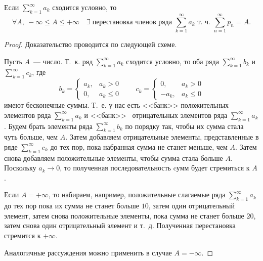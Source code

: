 \documentclass[../../main.tex]{subfiles}
\begin{document}
\begin{thm}[Риман]
	Если $\sum\limits_{k = 1}^{\infty} a_k$ сходится условно, то
	\[\forall A,\ - \infty \leq A \leq + \infty \quad \exists\;
	\text{перестановка членов ряда } \sum\limits_{k = 1}^{\infty} a_k \text{ 
	т.~ч. }
	\sum\limits_{n = 1}^{\infty} p_n = A.\]
	\begin{proof}
		Доказательство проводится по следующей схеме.
		
		Пусть $A$~--- число. Т.~к. ряд
		$\sum\limits_{k = 1}^{\infty} a_k$ сходится условно, то оба ряда
		$\sum\limits_{k = 1}^{\infty} b_k$ и
		$\sum\limits_{k = 1}^{\infty} c_k$, где
		\[b_k = \begin{cases}
			a_k,& a_k > 0\\
			0,& a_k \le 0
		  \end{cases} \qquad
		 c_k = \begin{cases}
			0,& a_k > 0\\
			-a_k,& a_k \le 0
		  \end{cases}\]
		  имеют бесконечные суммы. Т.~е. у нас есть <<банк>> положительных
		  элементов	ряда $\sum\limits_{k = 1}^{\infty} a_k$ и <<банк>> \
		  отрицательных элементов ряда $\sum\limits_{k = 1}^{\infty} a_k$.
		  Будем брать элементы ряда $\sum\limits_{k = 1}^{\infty} b_k$
		  по порядку так, чтобы их сумма стала чуть больше, чем $A$.
		  Затем добавляем отрицательные элементы, представленные в ряде
		  $\sum\limits_{k = 1}^{\infty} c_k$ до тех пор, пока набранная
		  сумма не станет меньше, чем $A$. Затем снова добавляем положительные
		  элементы, чтобы сумма стала больше $A$. Поскольку $a_k \to 0$,
		  то полученная последовательность cумм будет стремиться к $A$.

		  Если $A = +\infty$, то набираем, например, положительные
		  слагаемые ряда $\sum\limits_{k = 1}^{\infty} a_k$ до тех пор
		  пока их сумма не станет больше $10$, затем один отрицательный элемент,
		  затем снова положительные элементы, пока сумма не станет больше $20$, 
		  затем снова один
		  отрицательный элемент и т.~д. Полученная перестановка стремится к
		  $+ \infty$.
		  
		  Аналогичные рассуждения можно применить в случае $A = -\infty$.
	\end{proof}
\end{thm}
\end{document}
